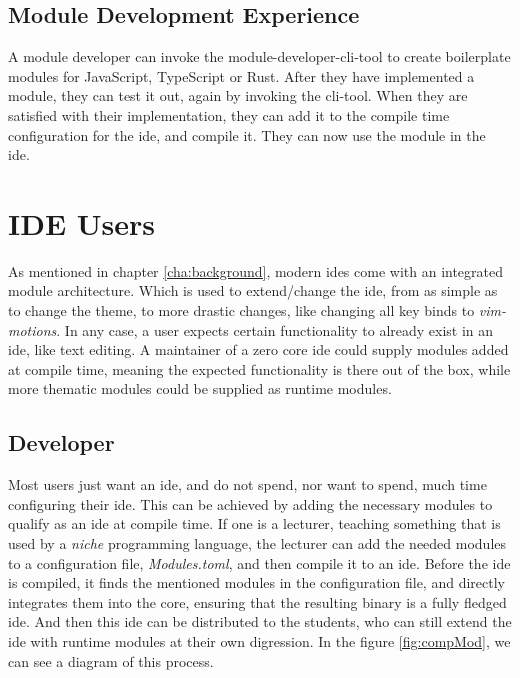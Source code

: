 \subsection{Module Development Experience}

A module developer can invoke the module-developer-\gls{cli}-tool to create
boilerplate modules for JavaScript, TypeScript or Rust. After they have
implemented a module, they can test it out, again by invoking the
\gls{cli}-tool. When they are satisfied with their implementation, they can add
it to the compile time configuration for the \gls{ide}, and compile it. They
can now use the module in the \gls{ide}.

\section{IDE Users}

As mentioned in chapter \ref{cha:background}, modern \gls{ide}s come with an
integrated module architecture. Which is used to extend/change the \gls{ide},
from as simple as to change the theme, to more drastic changes, like changing
all key binds to \textit{vim-motions}. In any case, a user expects certain
functionality to already exist in an \gls{ide}, like text editing. A maintainer
of a zero core \gls{ide} could supply modules added at compile time, meaning the
expected functionality is there out of the box, while more thematic modules
could be supplied as runtime modules.


\subsection{Developer}

Most users just want an \gls{ide}, and do not spend, nor want to spend, much
time configuring their \gls{ide}. This can be achieved by adding the necessary
modules to qualify as an \gls{ide} at compile time. If one is a lecturer,
teaching something that is used by a \textit{niche} programming language, the
lecturer can add the needed modules to a configuration file,
\textit{Modules.toml}, and then compile it to an \gls{ide}. Before the \gls{ide}
is compiled, it finds the mentioned modules in the configuration file, and
directly integrates them into the core, ensuring that the resulting binary is a
fully fledged \gls{ide}. And then this \gls{ide} can be distributed to the
students, who can still extend the \gls{ide} with runtime modules at their own
digression. In the figure \ref{fig:compMod}, we can see a diagram of this
process.

